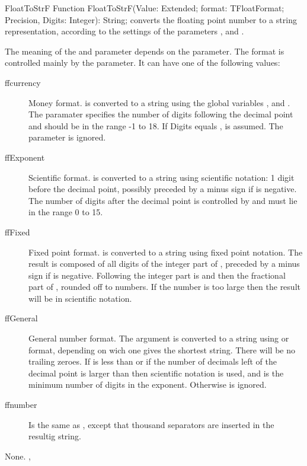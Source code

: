 \begin{function}{FloatToStrF}
\Declaration
Function FloatToStrF(Value: Extended; format: TFloatFormat; Precision, Digits: Integer): String;
\Description
{} converts the floating point number  to a string
representation, according to the settings of the parameters ,
 and .

The meaning of the  and  parameter depends on the
 parameter. The format is controlled mainly by the 
parameter. It can have one of the following values:
\begin{description}
\item[ffcurrency] Money format.  is converted to a string using
the global variables ,  and
. The  paramater specifies the number of digits
following the decimal point and should be in the range -1 to 18. If Digits
equals ,  is assumed. The  parameter is ignored.
%
\item[ffExponent] Scientific format.  is converted to a
string using scientific notation: 1 digit before the decimal point, possibly
preceded by a minus sign if  is negative. The number of
digits after the decimal point is controlled by  and must lie
in the range 0 to 15.
%
\item[ffFixed] Fixed point format.  is converted to a string
using fixed point notation. The result is composed of all digits of the
integer part of , preceded by a minus sign if  is
negative. Following the integer part is  and then the
fractional part of , rounded off to  numbers.
If the number is too large then the result will be in scientific notation.
%
\item[ffGeneral] General number format. The argument is converted to a
string using  or  format, depending on wich one
gives the shortest string. There will be no trailing zeroes. If 
is less than  or if the number of decimals left of the decimal
point is larger than  then scientific notation is used, and
 is the minimum number of digits in the exponent. Otherwise
 is ignored.
\item[ffnumber] Is the same as , except that thousand separators
are inserted in the resultig string.
\end{description}
\Errors
None.
\SeeAlso
{}, 
\end{function}

